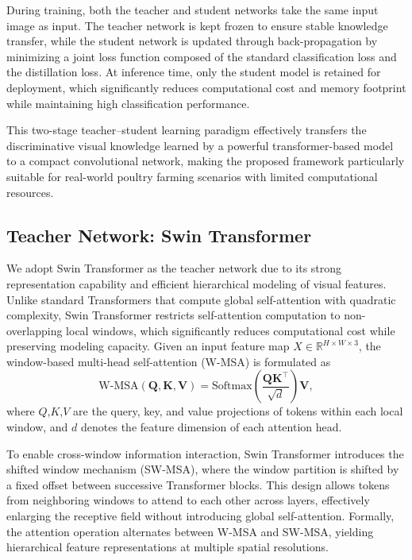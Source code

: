\documentclass[review]{elsarticle}
\begin{document}
During training, both the teacher and student networks take the same input image as input. The teacher network is kept frozen to ensure stable knowledge transfer, while the student network is updated through back-propagation by minimizing a joint loss function composed of the standard classification loss and the distillation loss. At inference time, only the student model is retained for deployment, which significantly reduces computational cost and memory footprint while maintaining high classification performance.

This two-stage teacher–student learning paradigm effectively transfers the discriminative visual knowledge learned by a powerful transformer-based model to a compact convolutional network, making the proposed framework particularly suitable for real-world poultry farming scenarios with limited computational resources.

\subsection{Teacher Network: Swin Transformer}
We adopt Swin Transformer as the teacher network due to its strong representation capability and efficient hierarchical modeling of visual features. Unlike standard Transformers that compute global self-attention with quadratic complexity, Swin Transformer restricts self-attention computation to non-overlapping local windows, which significantly reduces computational cost while preserving modeling capacity. Given an input feature map $X \in \mathbb{R}^{H \times W \times 3}$, the window-based multi-head self-attention (W-MSA) is formulated as 
\begin{equation}
\text{W-MSA}(\mathbf{Q}, \mathbf{K}, \mathbf{V}) = \text{Softmax} \left( \frac{\mathbf{Q} \mathbf{K}^\top}{\sqrt{d}} \right) \mathbf{V},
\label{eq:w_msa}
\end{equation}
where $Q$,$K$,$V$ are the query, key, and value projections of tokens within each local window, and $d$ denotes the feature dimension of each attention head.

To enable cross-window information interaction, Swin Transformer introduces the shifted window mechanism (SW-MSA), where the window partition is shifted by a fixed offset between successive Transformer blocks. This design allows tokens from neighboring windows to attend to each other across layers, effectively enlarging the receptive field without introducing global self-attention. Formally, the attention operation alternates between W-MSA and SW-MSA, yielding hierarchical feature representations at multiple spatial resolutions.
\end{document}
